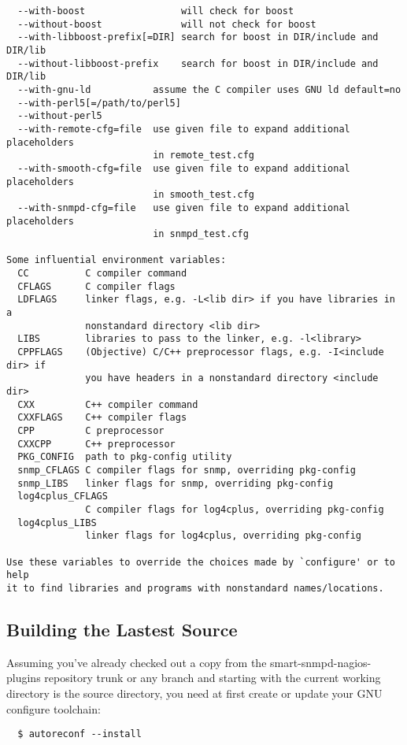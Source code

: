 \begin{verbatim}
  --with-boost                 will check for boost
  --without-boost              will not check for boost
  --with-libboost-prefix[=DIR] search for boost in DIR/include and DIR/lib
  --without-libboost-prefix    search for boost in DIR/include and DIR/lib
  --with-gnu-ld           assume the C compiler uses GNU ld default=no
  --with-perl5[=/path/to/perl5]
  --without-perl5
  --with-remote-cfg=file  use given file to expand additional placeholders
                          in remote_test.cfg
  --with-smooth-cfg=file  use given file to expand additional placeholders
                          in smooth_test.cfg
  --with-snmpd-cfg=file   use given file to expand additional placeholders
                          in snmpd_test.cfg

Some influential environment variables:
  CC          C compiler command
  CFLAGS      C compiler flags
  LDFLAGS     linker flags, e.g. -L<lib dir> if you have libraries in a
              nonstandard directory <lib dir>
  LIBS        libraries to pass to the linker, e.g. -l<library>
  CPPFLAGS    (Objective) C/C++ preprocessor flags, e.g. -I<include dir> if
              you have headers in a nonstandard directory <include dir>
  CXX         C++ compiler command
  CXXFLAGS    C++ compiler flags
  CPP         C preprocessor
  CXXCPP      C++ preprocessor
  PKG_CONFIG  path to pkg-config utility
  snmp_CFLAGS C compiler flags for snmp, overriding pkg-config
  snmp_LIBS   linker flags for snmp, overriding pkg-config
  log4cplus_CFLAGS
              C compiler flags for log4cplus, overriding pkg-config
  log4cplus_LIBS
              linker flags for log4cplus, overriding pkg-config

Use these variables to override the choices made by `configure' or to help
it to find libraries and programs with nonstandard names/locations.
\end{verbatim}

\subsection{Building the Lastest Source}

Assuming you've already checked out a copy from the smart-snmpd-nagios-plugins
repository trunk or any branch and starting with the current working
directory is the source directory, you need at first create or update your
GNU configure toolchain:

\begin{verbatim}
  $ autoreconf --install
\end{verbatim}

